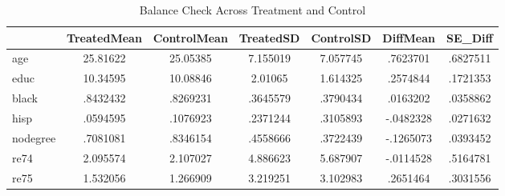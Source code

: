\begin{table}[htbp]\centering
\caption{Balance Check Across Treatment and Control}
\begin{tabular}{l*{6}{c}}
\hline\hline
            & TreatedMean& ControlMean&   TreatedSD&   ControlSD&    DiffMean&     SE\_Diff\\
\hline
age         &    25.81622&    25.05385&    7.155019&    7.057745&    .7623701&    .6827511\\
educ        &    10.34595&    10.08846&     2.01065&    1.614325&    .2574844&    .1721353\\
black       &    .8432432&    .8269231&    .3645579&    .3790434&    .0163202&    .0358862\\
hisp        &    .0594595&    .1076923&    .2371244&    .3105893&   -.0482328&    .0271632\\
nodegree    &    .7081081&    .8346154&    .4558666&    .3722439&   -.1265073&    .0393452\\
re74        &    2.095574&    2.107027&    4.886623&    5.687907&   -.0114528&    .5164781\\
re75        &    1.532056&    1.266909&    3.219251&    3.102983&    .2651464&    .3031556\\
\hline\hline
\end{tabular}
\end{table}
